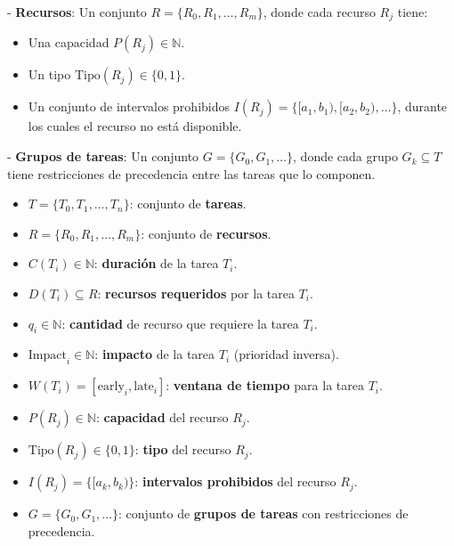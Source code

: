 \documentclass{article}
\begin{document}
- \textbf{Recursos}: Un conjunto \( R = \{R_0, R_1, \dots, R_m\} \), donde cada recurso \( R_j \) tiene:
  \begin{itemize}
    \item Una capacidad \( P(R_j) \in \mathbb{N} \).
    \item Un tipo \( \text{Tipo}(R_j) \in \{0, 1\} \).
    \item Un conjunto de intervalos prohibidos \( I(R_j) = \{[a_1, b_1), [a_2, b_2), \dots\} \), durante los cuales el recurso no está disponible.
  \end{itemize}

- \textbf{Grupos de tareas}: Un conjunto \( G = \{G_0, G_1, \dots\} \), donde cada grupo \( G_k \subseteq T \) tiene restricciones de precedencia entre las tareas que lo componen.

\vspace{0.5cm}

\begin{tcolorbox}[colback=gray!5!white, colframe=gray!75!black, title={Parámetros del modelo}]
    \begin{itemize}
        \item \( T = \{T_0, T_1, \dots, T_n\} \): conjunto de \textbf{tareas}.
        \item \( R = \{R_0, R_1, \dots, R_m\} \): conjunto de \textbf{recursos}.
        \item \( C(T_i) \in \mathbb{N} \): \textbf{duración} de la tarea \( T_i \).
        \item \( D(T_i) \subseteq R \): \textbf{recursos requeridos} por la tarea \( T_i \).
        \item \( q_i \in \mathbb{N} \): \textbf{cantidad} de recurso que requiere la tarea \( T_i \).
        \item \( \text{Impact}_i \in \mathbb{N} \): \textbf{impacto} de la tarea \( T_i \) (prioridad inversa).
        \item \( W(T_i) = [\text{early}_i, \text{late}_i] \): \textbf{ventana de tiempo} para la tarea \( T_i \).
        \item \( P(R_j) \in \mathbb{N} \): \textbf{capacidad} del recurso \( R_j \).
        \item \( \text{Tipo}(R_j) \in \{0, 1\} \): \textbf{tipo} del recurso \( R_j \).
        \item \( I(R_j) = \{[a_k, b_k)\} \): \textbf{intervalos prohibidos} del recurso \( R_j \).
        \item \( G = \{G_0, G_1, \dots\} \): conjunto de \textbf{grupos de tareas} con restricciones de precedencia.
    \end{itemize}
\end{tcolorbox}
\end{document}
